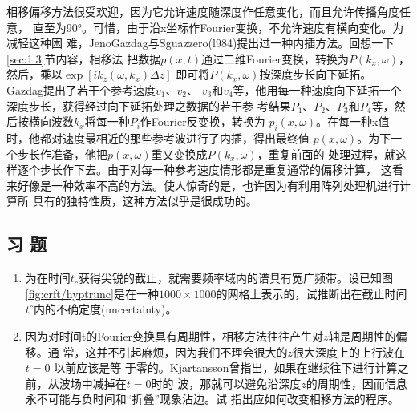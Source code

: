 相移偏移方法很受欢迎，因为它允许速度随深度作任意变化，而且允许传播角度任意，
直至为90°。可惜，由于沿x坐标作Fourier变换，不允许速度有横向变化。为减轻这种困
难，JenoGazdag与Sguazzero(l984)提出过一种内插方法。回想一下\ref{sec:1.3}节内容，相移法
把数据$p(x,t)$通过二维Fourier变换，转换为$P(k_x,\omega)$，然后，乘以$\exp[ik_z(\omega,k_x)\Delta z]$
即可将$P(k_x,\omega)$按深度步长向下延拓。
Gazdag提出了若干个参考速度$v_1$、$v_2$、
$v_3$和$v_4$等，他用每一种速度向下延拓一个深度步长，获得经过向下延拓处理之数据的若干参
考结果$P_1$、$P_2$、$P_3$和$P_4$等，然后按横向波数$k_x$将每一种$P_i$作Fourier反变换，转换为
$p_i(x,\omega)$。在每一种x值时，他都对速度最相近的那些参考波进行了内插，得出最终值
$p(x,\omega)$。为下一个步长作准备，他把$p(x,\omega)$重又变换成$P(k_x,\omega)$，重复前面的
处理过程，就这样逐个步长作下去。由于对每一种参考速度情形都是重复通常的偏移计算，
这看来好像是一种效率不高的方法。使人惊奇的是，也许因为有利用阵列处理机进行计算所
具有的独特性质，这种方法似乎是很成功的。

\subsection{习 题}
\label{sec:4.5.6}

\begin{enumerate}
\item 为在时间$t_c$获得尖锐的截止，就需要频率域内的谱具有宽广频带。设已知图\ref{fig:crft/hyptrunc}是在一种$1000\times
1000$的网格上表示的，试推断出在截止时间$t^c$内的不确定度(uncertainty)。
\item 因为对时间t的Fourier变换具有周期性，相移方法往往产生对$z$轴是周期性的偏移。通
常，这并不引起麻烦，因为我们不理会很大的$z$很大深度上的上行波在$t=0$
以前应该是等
于零的。Kjartansson曾指出，如果在继续往下进行计算之前，从波场中减掉在$t=0$时的
波，那就可以避免沿深度$z$的周期性，因而信息永不可能与负时间和“折叠”现象沾边。试
指出应如何改变相移方法的程序。
\end{enumerate}

